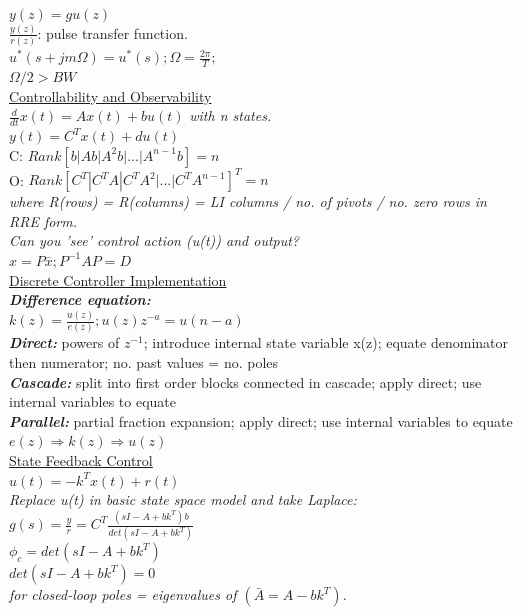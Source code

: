 \documentclass[a4paper, 10pt, titlepage]{article}
\begin{document}
\begin{paracol}{3}[]
$y(z)=gu(z)$\\
$\frac{y(z)}{r(z)}$: pulse transfer function.\\
$u^*(s+jm\Omega) = u^*(s);\Omega = \frac{2\pi}{T};$\\
$\Omega/2>BW$\\
\underline{Controllability and Observability} \\
$\frac{d}{dt} x(t) = Ax(t) + bu(t)$ \textit{with n states.} \\
$y(t) = C^Tx(t) + du(t)$ \\
C: $Rank[b|Ab|A^2b|...|A^{n-1}b] = n$ \\
O: $Rank[C^T|C^TA|C^TA^2|...|C^TA^{n-1}]^T = n$ \\
\textit{where R(rows) = R(columns) = LI columns / no. of pivots / no. zero rows in RRE form.} \\
\textit{Can you 'see' control action (u(t)) and output?}\\
$x=P\bar{x}; P^{-1}AP = D$ \\
\underline{Discrete Controller Implementation} \\
\textbf{\textit{Difference equation:}} \\
$k(z) = \frac{u(z)}{e(z)};u(z)z^{-a} = u(n-a)$ \\
\textbf{\textit{Direct:}} powers of $z^{-1}$; introduce internal state variable x(z); equate denominator then numerator; no. past values = no. poles \\
\textbf{\textit{Cascade:}} split into first order blocks connected in cascade; apply direct; use internal variables to equate \\
\textbf{\textit{Parallel:}} partial fraction expansion; apply direct; use internal variables to equate \\
$e(z)\Rightarrow k(z) \Rightarrow u(z)$ \\

\switchcolumn 
\underline{State Feedback Control} \\
$u(t) = -k^Tx(t) + r(t)$ \\
\textit{Replace u(t) in basic state space model and take Laplace:} \\
$g(s) = \frac{y}{r} = C^T \frac{(sI-A+bk^T)b}{det(sI-A+bk^T)}$ \\
$\phi_c = det(sI-A+bk^T)$ \\ 
$det(sI-A+bk^T) = 0$ \\ 
\textit{for closed-loop poles = eigenvalues of $(\bar{A} = A - bk^T)$.} \\


\end{paracol}
\end{document}
